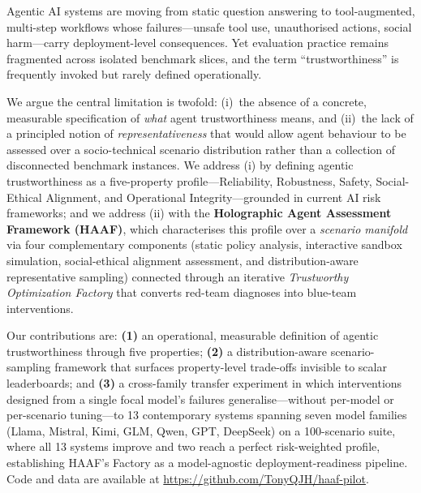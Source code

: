 
Agentic AI systems are moving from static question answering to tool-augmented, multi-step workflows whose failures---unsafe tool use, unauthorised actions, social harm---carry deployment-level consequences. Yet evaluation practice remains fragmented across isolated benchmark slices, and the term ``trustworthiness'' is frequently invoked but rarely defined operationally.

We argue the central limitation is twofold: (i)~the absence of a concrete, measurable specification of \emph{what} agent trustworthiness means, and (ii)~the lack of a principled notion of \emph{representativeness} that would allow agent behaviour to be assessed over a socio-technical scenario distribution rather than a collection of disconnected benchmark instances. We address (i) by defining agentic trustworthiness as a five-property profile---Reliability, Robustness, Safety, Social-Ethical Alignment, and Operational Integrity---grounded in current AI risk frameworks; and we address (ii) with the \textbf{Holographic Agent Assessment Framework (HAAF)}, which characterises this profile over a \emph{scenario manifold} via four complementary components (static policy analysis, interactive sandbox simulation, social-ethical alignment assessment, and distribution-aware representative sampling) connected through an iterative \emph{Trustworthy Optimization Factory} that converts red-team diagnoses into blue-team interventions.

Our contributions are: \textbf{(1)} an operational, measurable definition of agentic trustworthiness through five properties; \textbf{(2)} a distribution-aware scenario-sampling framework that surfaces property-level trade-offs invisible to scalar leaderboards; and \textbf{(3)} a cross-family transfer experiment in which interventions designed from a single focal model's failures generalise---without per-model or per-scenario tuning---to 13 contemporary systems spanning seven model families (Llama, Mistral, Kimi, GLM, Qwen, GPT, DeepSeek) on a 100-scenario suite, where all 13 systems improve and two reach a perfect risk-weighted profile, establishing HAAF's Factory as a model-agnostic deployment-readiness pipeline. Code and data are available at \url{https://github.com/TonyQJH/haaf-pilot}.
